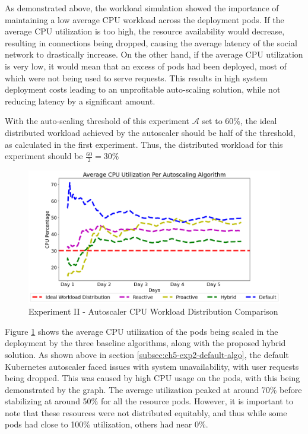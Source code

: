 As demonstrated above, the workload simulation showed the importance of maintaining a low average CPU workload across the deployment pods. If the average CPU utilization is too high, the resource availability would decrease, resulting in connections being dropped, causing the average latency of the social network to drastically increase. On the other hand, if the average CPU utilization is very low, it would mean that an excess of pods had been deployed, most of which were not being used to serve requests. This results in high system deployment costs leading to an unprofitable auto-scaling solution, while not reducing latency by a significant amount.\par

With the auto-scaling threshold of this experiment $\mathcal{A}$ set to 60\%, the ideal distributed workload achieved by the autoscaler should be half of the threshold, as calculated in the first experiment. Thus, the distributed workload for this experiment should be $\frac{60}{2} = 30\%$

\begin{figure}[htb]
    \centering
    \caption{Experiment II - Autoscaler CPU Workload Distribution Comparison}
    \label{fig:exp2-cpu-avg-dist}
    \includegraphics[width=0.6\linewidth]{Figures/Compose-Post-CPU-Usage.png}
\end{figure}

Figure \ref{fig:exp2-cpu-avg-dist} shows the average CPU utilization of the pods being scaled in the deployment by the three baseline algorithms, along with the proposed hybrid solution. As shown above in section \ref{subsec:ch5-exp2-default-algo}, the default Kubernetes autoscaler faced issues with system unavailability, with user requests being dropped. This was caused by high CPU usage on the pods, with this being demonstrated by the graph. The average utilization peaked at around 70\% before stabilizing at around 50\% for all the resource pods. However, it is important to note that these resources were not distributed equitably, and thus while some pods had close to 100\% utilization, others had near 0\%.\par

